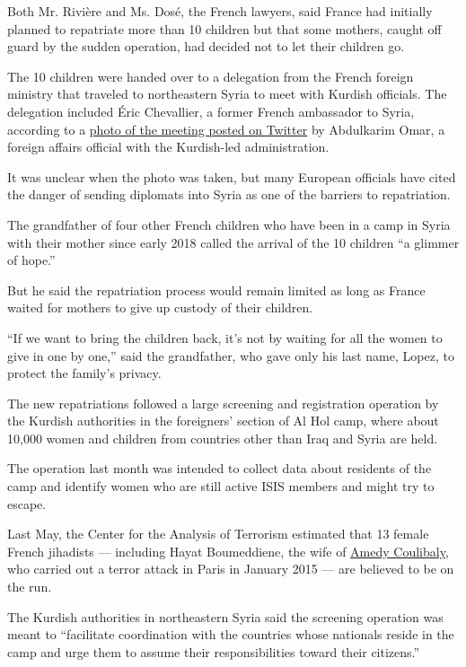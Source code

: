 Both Mr. Rivière and Ms. Dosé, the French lawyers, said France had
initially planned to repatriate more than 10 children but that some
mothers, caught off guard by the sudden operation, had decided not to
let their children go.

The 10 children were handed over to a delegation from the French foreign
ministry that traveled to northeastern Syria to meet with Kurdish
officials. The delegation included Éric Chevallier, a former French
ambassador to Syria, according to a
\href{https://twitter.com/abdulkarimomar1/status/1274860769750941696}{photo
of the meeting posted on Twitter} by Abdulkarim Omar, a foreign affairs
official with the Kurdish-led administration.

It was unclear when the photo was taken, but many European officials
have cited the danger of sending diplomats into Syria as one of the
barriers to repatriation.

The grandfather of four other French children who have been in a camp in
Syria with their mother since early 2018 called the arrival of the 10
children ``a glimmer of hope.''

But he said the repatriation process would remain limited as long as
France waited for mothers to give up custody of their children.

``If we want to bring the children back, it's not by waiting for all the
women to give in one by one,'' said the grandfather, who gave only his
last name, Lopez, to protect the family's privacy.

The new repatriations followed a large screening and registration
operation by the Kurdish authorities in the foreigners' section of Al
Hol camp, where about 10,000 women and children from countries other
than Iraq and Syria are held.

The operation last month was intended to collect data about residents of
the camp and identify women who are still active ISIS members and might
try to escape.

Last May, the Center for the Analysis of Terrorism estimated that 13
female French jihadists --- including Hayat Boumeddiene, the wife of
\href{https://www.nytimes3xbfgragh.onion/2015/01/11/world/europe/neighbors-say-suspect-in-french-attacks-and-his-companion-lived-quiet-lives.html}{Amedy
Coulibaly}, who carried out a terror attack in Paris in January 2015 ---
are believed to be on the run.

The Kurdish authorities in northeastern Syria said the screening
operation was meant to ``facilitate coordination with the countries
whose nationals reside in the camp and urge them to assume their
responsibilities toward their citizens.''

